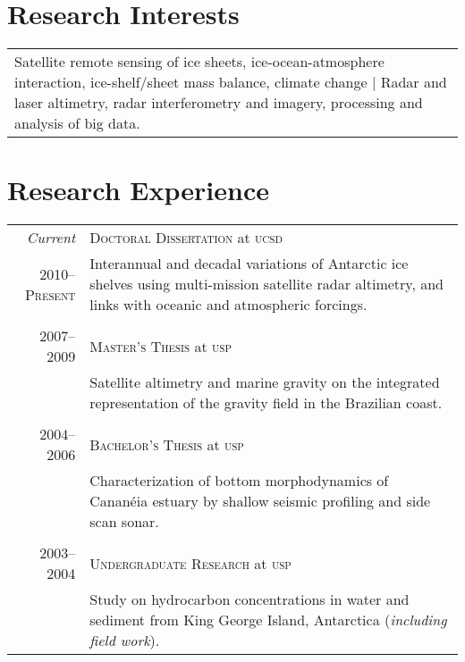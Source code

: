 \documentclass[a4paper,11pt]{article}
\begin{document}
\section{Research Interests}

\begin{tabular}{p{}}
Satellite remote sensing of ice sheets, ice-ocean-atmosphere interaction, ice-shelf/sheet mass balance, climate change | Radar and laser altimetry, radar interferometry and imagery, processing and analysis of big data.
\end{tabular}


\section{Research Experience}

\begin{tabular}{r|p{12.4cm}}
\emph{Current} & \textsc{Doctoral Dissertation} at \textsc{ucsd} \\
2010--\textsc{Present} & \small{Interannual and decadal variations of Antarctic ice shelves using multi-mission satellite radar altimetry, and links with oceanic and atmospheric forcings.}\\
\multicolumn{2}{c}{} \\


2007--2009 & \textsc{Master's Thesis} at \textsc{usp}\\
& \small{Satellite altimetry and marine gravity on the integrated representation of the gravity field in the Brazilian coast.}\\
\multicolumn{2}{c}{} \\


2004--2006 & \textsc{Bachelor's Thesis} at \textsc{usp}\\
& \small{Characterization of bottom morphodynamics of Canan\'eia estuary by shallow seismic profiling and side scan sonar.}\\
\multicolumn{2}{c}{} \\


2003--2004 & \textsc{Undergraduate Research} at \textsc{usp}\\
& \small{Study on hydrocarbon concentrations in water and sediment from King George Island, Antarctica (\emph{including field work}).}
\end{tabular}
\end{document}
